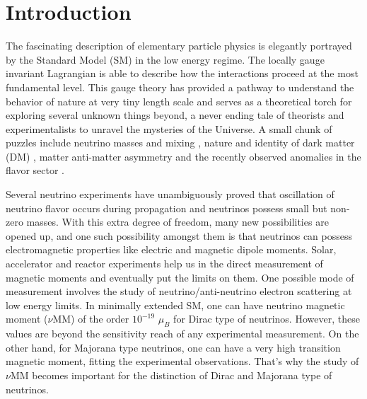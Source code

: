 \documentclass[aps, a4paper,superscriptaddress,12pt,preprintnumbers,floatfix,nofootinbib,amsmath,amssymb]{revtex4}
\begin{document}
\section{Introduction}
The fascinating description of elementary particle physics is elegantly portrayed by the Standard Model (SM) in the low energy regime. The locally gauge invariant Lagrangian is able to describe how the interactions proceed at the most fundamental level.  This gauge theory has provided a pathway to understand the behavior of nature at very tiny length scale and serves as a theoretical torch for exploring  several unknown things beyond, a never ending tale of theorists and experimentalists to unravel the mysteries of the Universe. A small chunk of puzzles include neutrino masses and mixing \cite{Bilenky:1999ge,Mohapatra:1979ia,Schechter:1980gr,Babu:1992ia,Super-Kamiokande:2005wtt,SNO:2002tuh,Super-Kamiokande:2016yck,T2K:2019efw,DayaBay:2012fng,DoubleChooz:2011ymz}, nature and identity of dark matter (DM) \cite{Zwicky:1937zza,PhysRev.43.147,Bertone:2004pz,Mambrini:2015vna}, matter anti-matter asymmetry \cite{Sakharov:1967dj,Kolb:1979qa,Fukugita:1986hr,Fritzsch:1974nn} and the recently observed  anomalies in the flavor sector \cite{Bifani:2018zmi}.

Several neutrino experiments have unambiguously proved that oscillation of neutrino flavor occurs during propagation and neutrinos possess small but non-zero masses.  With this extra degree of freedom, many new possibilities are opened up, and  one such possibility amongst them is that neutrinos can possess electromagnetic properties like electric and magnetic dipole moments. Solar, accelerator and reactor experiments help us in the direct measurement of magnetic moments and eventually put the  limits on them. One possible mode of measurement  involves the study of neutrino/anti-neutrino electron scattering at low energy limits. In minimally extended SM, one can have neutrino magnetic moment ($\nu$MM) of the order $10^{-19}$ $\mu_{B}$ for Dirac type of neutrinos. However, these values are beyond the  sensitivity reach of any  experimental measurement. On the other hand, for Majorana type neutrinos,  one can have a very high transition magnetic moment, fitting the experimental observations. That's why the study of $\nu$MM becomes important for the distinction of Dirac and Majorana type of neutrinos.
\end{document}

